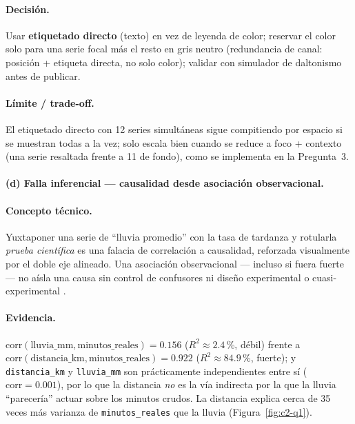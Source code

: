 \paragraph{Decisión.} Usar \textbf{etiquetado directo} (texto) en vez de leyenda de color; reservar el color solo para una serie focal más el resto en gris neutro (redundancia de canal: posición + etiqueta directa, no solo color); validar con simulador de daltonismo antes de publicar.

\paragraph{Límite / trade-off.} El etiquetado directo con 12 series simultáneas sigue compitiendo por espacio si se muestran todas a la vez; solo escala bien cuando se reduce a foco + contexto (una serie resaltada frente a 11 de fondo), como se implementa en la Pregunta~3.

\paragraph{(d) Falla inferencial --- causalidad desde asociación observacional.}

\paragraph{Concepto técnico.} Yuxtaponer una serie de ``lluvia promedio'' con la tasa de tardanza y rotularla \emph{prueba científica} es una falacia de correlación a causalidad, reforzada visualmente por el doble eje alineado. Una asociación observacional --- incluso si fuera fuerte --- no aísla una causa sin control de confusores ni diseño experimental o cuasi-experimental \citep{anscombe1973graphs}.

\paragraph{Evidencia.} $\mathrm{corr}(\text{lluvia\_mm}, \text{minutos\_reales}) = 0.156$ ($R^2 \approx 2.4$\,\%, débil) frente a $\mathrm{corr}(\text{distancia\_km}, \text{minutos\_reales}) = 0.922$ ($R^2 \approx 84.9$\,\%, fuerte); y \lstinline|distancia_km| y \lstinline|lluvia_mm| son prácticamente independientes entre sí ($\mathrm{corr}=0.001$), por lo que la distancia \emph{no} es la vía indirecta por la que la lluvia ``parecería'' actuar sobre los minutos crudos. La distancia explica cerca de 35 veces más varianza de \lstinline|minutos_reales| que la lluvia (Figura~\ref{fig:c2-q1}).

